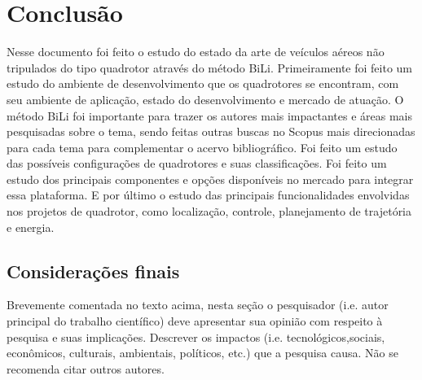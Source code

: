 \chapter{Conclusão}
\label{chap:conc}

Nesse documento foi feito o estudo do estado da arte de veículos aéreos não tripulados do tipo quadrotor através do método BiLi. Primeiramente foi feito um estudo do ambiente de desenvolvimento que os quadrotores se encontram, com seu ambiente de aplicação, estado do desenvolvimento e mercado de atuação. O método BiLi foi importante para trazer os autores mais impactantes e áreas mais pesquisadas sobre o tema, sendo feitas outras buscas no Scopus mais direcionadas para cada tema para complementar o acervo bibliográfico. Foi feito um estudo das possíveis configurações de quadrotores e suas classificações. Foi feito um estudo dos principais componentes e opções disponíveis no mercado para integrar essa plataforma. E por último o estudo das principais funcionalidades envolvidas nos projetos de quadrotor, como localização, controle, planejamento de trajetória e energia. 


\section{Considerações finais}
\label{sec:consid}

Brevemente comentada no texto acima, nesta se\c{c}\~ao o
pesquisador (i.e. autor principal do trabalho cient\'ifico) deve
apresentar sua opini\~ao com respeito \`a pesquisa e suas
implica\c{c}\~oes. Descrever os impactos (i.e.
tecnol\'ogicos,sociais, econ\^omicos, culturais, ambientais,
políticos, etc.) que a pesquisa causa. N\~ao se recomenda citar
outros autores.

